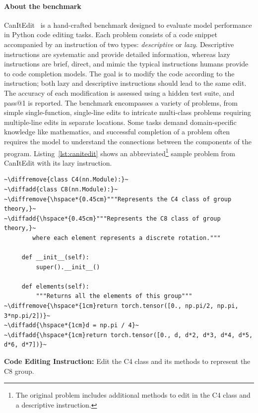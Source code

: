 \documentclass[10pt]{article} %
\newcommand{\diffline}{\vrule height 0pt depth 0pt width 0pt}
\newcommand{\diffadd}[1]{%
  \noindent\colorbox{diffaddcolor}{\makebox[\dimexpr\linewidth-2\fboxsep][l]{\diffline +#1}}}
\newcommand{\diffremove}[1]{%
  \noindent\colorbox{diffremovecolor}{\makebox[\dimexpr\linewidth-2\fboxsep][l]{\diffline -#1}}}
\begin{document}
\paragraph{About the benchmark} 
CanItEdit~\citep{cassano2023edit} is a hand-crafted benchmark designed to evaluate model performance in Python code editing tasks.
Each problem consists of a code snippet accompanied by an instruction of two types: \emph{descriptive} or \emph{lazy}.
Descriptive instructions are systematic and provide detailed information, whereas lazy instructions are brief, direct, 
and mimic the typical instructions humans provide to code completion models.
The goal is to modify the code according to the instruction; both lazy and descriptive instructions should 
lead to the same edit.
The accuracy of each modification is assessed using a hidden test suite, and pass@1 is reported.
The benchmark encompasses a variety of problems, from simple single-function, single-line edits to intricate multi-class problems requiring multiple-line edits in separate locations.
Some tasks demand domain-specific knowledge like mathematics, and successful completion of a problem often requires the model to understand the connections between the components of the program.
Listing~\ref{lst:canitedit} shows an abbreviated\footnote{The original problem includes additional methods to edit in the C4 class and a descriptive instruction.} sample problem from CanItEdit
with its lazy instruction.

\begin{center}
\begin{minipage}{.60\textwidth}
\begin{lstlisting}[style=canitedit,caption={Abbreviated sample problem from CanItEdit},label={lst:canitedit}, captionpos=t, breaklines=true]
~\diffremove{class C4(nn.Module):}~
~\diffadd{class C8(nn.Module):}~
~\diffremove{\hspace*{0.45cm}"""Represents the C4 class of group theory,}~
~\diffadd{\hspace*{0.45cm}"""Represents the C8 class of group theory,}~
        where each element represents a discrete rotation."""
 
     def __init__(self):
         super().__init__()
 
     def elements(self):
         """Returns all the elements of this group"""
~\diffremove{\hspace*{1cm}return torch.tensor([0., np.pi/2, np.pi, 3*np.pi/2])}~
~\diffadd{\hspace*{1cm}d = np.pi / 4}~
~\diffadd{\hspace*{1cm}return torch.tensor([0., d, d*2, d*3, d*4, d*5, d*6, d*7])}~
\end{lstlisting}
\textbf{Code Editing Instruction:} Edit the C4 class and its methods to represent the C8 group.
\end{minipage}
\end{center}
\end{document}
